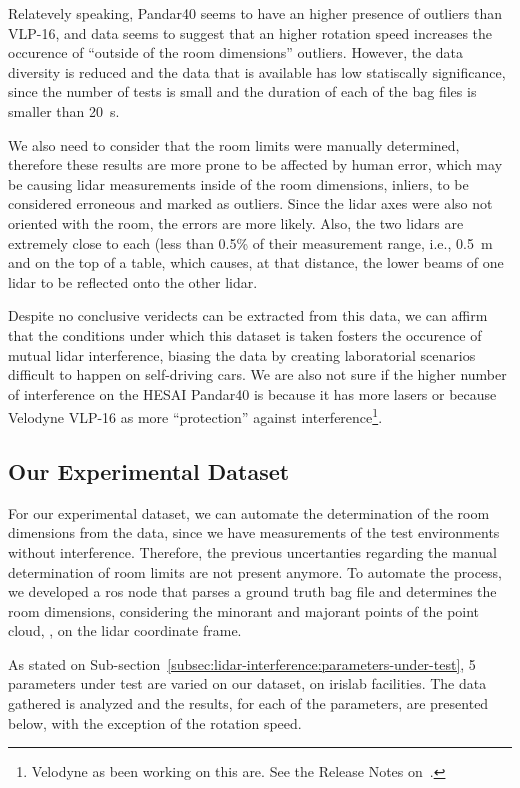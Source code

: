 Relatevely speaking, Pandar40 seems to have an higher presence of outliers than VLP-16, and data seems to suggest that an higher rotation speed increases the occurence of ``outside of the room dimensions'' outliers. However, the data diversity is reduced and the data that is available has low statiscally significance, since the number of tests is small and the duration of each of the bag files is smaller than \SI{20}{\second}.

We also need to consider that the room limits were manually determined, therefore these results are more prone to be affected by human error, which may be causing \ac{lidar} measurements inside of the room dimensions, inliers, to be considered erroneous and marked as outliers. Since the \ac{lidar} axes were also not oriented with the room, the errors are more likely. Also, the two \acp{lidar} are extremely close to each (less than 0.5\% of their measurement range, i.e., \SI{0.5}{\meter} and on the top of a table, which causes, at that distance, the lower beams of one \ac{lidar} to be reflected onto the other \ac{lidar}. 

Despite no conclusive veridects can be extracted from this data, we can affirm that the conditions under which this dataset is taken fosters the occurence of mutual \ac{lidar} interference, biasing the data by creating laboratorial scenarios difficult to happen on self-driving cars. We are also not sure if the higher number of interference on the HESAI Pandar40 is because it has more lasers or because Velodyne VLP-16 as more ``protection'' against interference\footnote{Velodyne as been working on this are. See the Release Notes on~\cite{vlp16}.}. 

\subsection{Our Experimental Dataset}
For our experimental dataset, we can automate the determination of the room dimensions from the data, since we have measurements of the test environments without interference. Therefore, the previous uncertanties regarding the manual determination of room limits are not present anymore. To automate the process, we developed a \ac{ros} node that parses a ground truth bag file and determines the room dimensions, considering the minorant and majorant points of the point cloud, , on the \ac{lidar} coordinate frame. 

As stated on Sub-section~\ref{subsec:lidar-interference:parameters-under-test}, 5 parameters under test are varied on our dataset, on \ac{irislab} facilities. The data gathered is analyzed and the results, for each of the parameters, are presented below, with the exception of the rotation speed.


